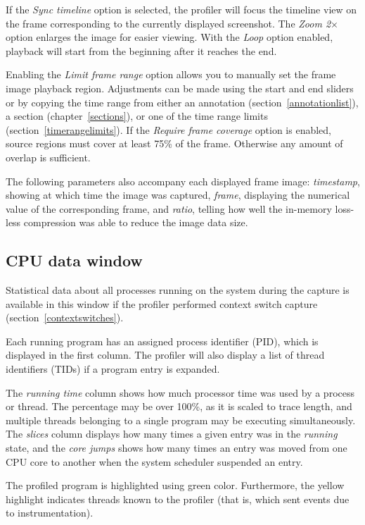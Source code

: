 \documentclass[hidelinks,titlepage,a4paper,twoside]{article}
\begin{document}
If the \emph{Sync timeline} option is selected, the profiler will focus the timeline view on the frame corresponding to the currently displayed screenshot. The \emph{Zoom 2$\times$} option enlarges the image for easier viewing. With the \emph{Loop} option enabled, playback will start from the beginning after it reaches the end.

Enabling the \emph{Limit frame range} option allows you to manually set the frame image playback region. Adjustments can be made using the start and end sliders or by copying the time range from either an annotation (section~\ref{annotationlist}), a section (chapter~\ref{sections}), or one of the time range limits (section~\ref{timerangelimits}). If the \emph{Require frame coverage} option is enabled, source regions must cover at least 75\% of the frame. Otherwise any amount of overlap is sufficient.

The following parameters also accompany each displayed frame image: \emph{timestamp}, showing at which time the image was captured, \emph{frame}, displaying the numerical value of the corresponding frame, and \emph{ratio}, telling how well the in-memory loss-less compression was able to reduce the image data size.

\subsection{CPU data window}
\label{cpudata}

Statistical data about all processes running on the system during the capture is available in this window if the profiler performed context switch capture (section~\ref{contextswitches}).

Each running program has an assigned process identifier (PID), which is displayed in the first column. The profiler will also display a list of thread identifiers (TIDs) if a program entry is expanded.

The \emph{running time} column shows how much processor time was used by a process or thread. The percentage may be over 100\%, as it is scaled to trace length, and multiple threads belonging to a single program may be executing simultaneously. The \emph{slices} column displays how many times a given entry was in the \emph{running} state, and the \emph{core jumps} shows how many times an entry was moved from one CPU core to another when the system scheduler suspended an entry.

The profiled program is highlighted using green color. Furthermore, the yellow highlight indicates threads known to the profiler (that is, which sent events due to instrumentation).
\end{document}
